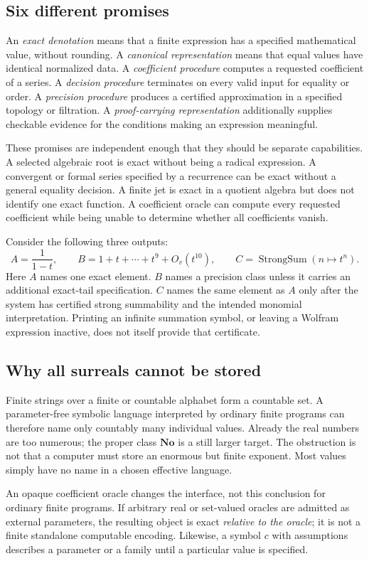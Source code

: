 \documentclass[11pt,letterpaper]{article}
\theoremstyle{definition}\newtheorem{definition}[theorem]{Definition}
\theoremstyle{remark}\newtheorem{remark}[theorem]{Remark}
\newcommand{\No}{\mathbf{No}}\newcommand{\SC}{\mathbf{SC}}
\numberwithin{equation}{section}\setcounter{tocdepth}{2}
\begin{document}
\subsection{Six different promises}
An \emph{exact denotation} means that a finite expression has a specified mathematical value, without rounding. A \emph{canonical representation} means that equal values have identical normalized data. A \emph{coefficient procedure} computes a requested coefficient of a series. A \emph{decision procedure} terminates on every valid input for equality or order. A \emph{precision procedure} produces a certified approximation in a specified topology or filtration. A \emph{proof-carrying representation} additionally supplies checkable evidence for the conditions making an expression meaningful.

These promises are independent enough that they should be separate capabilities. A selected algebraic root is exact without being a radical expression. A convergent or formal series specified by a recurrence can be exact without a general equality decision. A finite jet is exact in a quotient algebra but does not identify one exact function. A coefficient oracle can compute every requested coefficient while being unable to determine whether all coefficients vanish.

Consider the following three outputs:
\[
 A=\frac1{1-t},\qquad B=1+t+\cdots+t^9+O_v(t^{10}),\qquad
 C=\operatorname{StrongSum}(n\mapsto t^n).
\]
Here $A$ names one exact element. $B$ names a precision class unless it carries an additional exact-tail specification. $C$ names the same element as $A$ only after the system has certified strong summability and the intended monomial interpretation. Printing an infinite summation symbol, or leaving a Wolfram expression inactive, does not itself provide that certificate.

\subsection{Why all surreals cannot be stored}
Finite strings over a finite or countable alphabet form a countable set. A parameter-free symbolic language interpreted by ordinary finite programs can therefore name only countably many individual values. Already the real numbers are too numerous; the proper class $\No$ is a still larger target. The obstruction is not that a computer must store an enormous but finite exponent. Most values simply have no name in a chosen effective language.

An opaque coefficient oracle changes the interface, not this conclusion for ordinary finite programs. If arbitrary real or set-valued oracles are admitted as external parameters, the resulting object is exact \emph{relative to the oracle}; it is not a finite standalone computable encoding. Likewise, a symbol $c$ with assumptions describes a parameter or a family until a particular value is specified.
\end{document}
